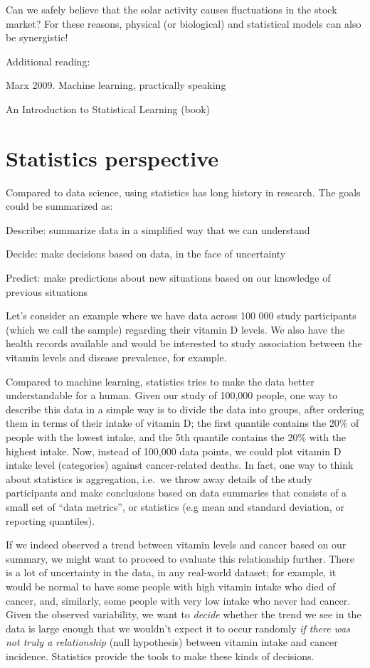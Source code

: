 \documentclass[
]{book}
\begin{document}
Can we safely believe that the solar activity causes fluctuations in the stock market? For these reasons, physical (or biological) and statistical models can also be synergistic!

Additional reading:

Marx 2009. Machine learning, practically speaking

An Introduction to Statistical Learning (book)

\hypertarget{statistics-perspective}{%
\chapter{Statistics perspective}\label{statistics-perspective}}

Compared to data science, using statistics has long history in research. The goals could be summarized as:

Describe: summarize data in a simplified way that we can understand

Decide: make decisions based on data, in the face of uncertainty

Predict: make predictions about new situations based on our knowledge of previous situations

Let's consider an example where we have data across 100 000 study participants (which we call the sample) regarding their vitamin D levels. We also have the health records available and would be interested to study association between the vitamin levels and disease prevalence, for example.

Compared to machine learning, statistics tries to make the data better understandable for a human. Given our study of 100,000 people, one way to describe this data in a simple way is to divide the data into groups, after ordering them in terms of their intake of vitamin D; the first quantile contains the 20\% of people with the lowest intake, and the 5th quantile contains the 20\% with the highest intake. Now, instead of 100,000 data points, we could plot vitamin D intake level (categories) against cancer-related deaths. In fact, one way to think about statistics is aggregation, i.e.~we throw away details of the study participants and make conclusions based on data summaries that consists of a small set of ``data metrics'', or statistics (e.g mean and standard deviation, or reporting quantiles).

If we indeed observed a trend between vitamin levels and cancer based on our summary, we might want to proceed to evaluate this relationship further. There is a lot of uncertainty in the data, in any real-world dataset; for example, it would be normal to have some people with high vitamin intake who died of cancer, and, similarly, some people with very low intake who never had cancer. Given the observed variability, we want to \emph{decide} whether the trend we see in the data is large enough that we wouldn't expect it to occur randomly \emph{if there was not truly a relationship} (null hypothesis) between vitamin intake and cancer incidence. Statistics provide the tools to make these kinds of decisions.
\end{document}
